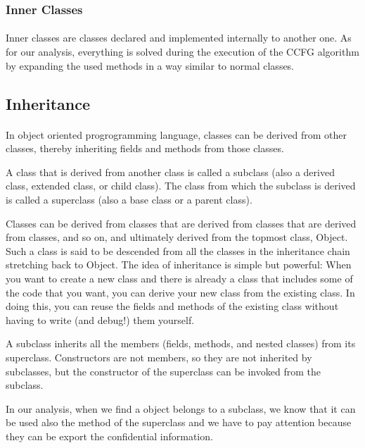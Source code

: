 \documentclass[letterpaper,twocolumn,10pt]{article}
\begin{document}
\subsubsection{Inner Classes} \paragraph{}
Inner classes are classes declared and implemented internally to another one. As for our analysis, everything is solved during the execution of the CCFG algorithm by expanding the used methods in a way similar to normal classes. 

\subsection{Inheritance} \paragraph{}
In object oriented progrogramming language, classes can be derived from other classes, thereby inheriting fields and methods from those classes.

A class that is derived from another class is called a subclass (also a derived class, extended class, or child class). The class from which the subclass is derived is called a superclass (also a base class or a parent class).

Classes can be derived from classes that are derived from classes that are derived from classes, and so on, and ultimately derived from the topmost class, Object. Such a class is said to be descended from all the classes in the inheritance chain stretching back to Object.
The idea of inheritance is simple but powerful: When you want to create a new class and there is already a class that includes some of the code that you want, you can derive your new class from the existing class. In doing this, you can reuse the fields and methods of the existing class without having to write (and debug!) them yourself.

A subclass inherits all the members (fields, methods, and nested classes) from its superclass. Constructors are not members, so they are not inherited by subclasses, but the constructor of the superclass can be invoked from the subclass.

In our analysis, when we find a object belongs to a subclass, we know that it can be used also the method of the superclass and we have to pay attention because they can be export the confidential information.
\end{document}
